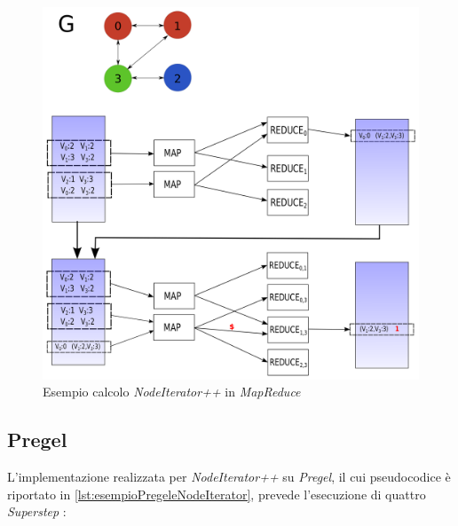 \documentclass[LaM,binding=0.6cm]{sapthesis}
\begin{document}
\begin{minipage}{\linewidth}
	
\end{minipage}
\begin{minipage}{\linewidth}
	
\end{minipage}


\begin{figure}
\centering
\includegraphics[width=1\textwidth]{MR-trianglepp}
\caption{Esempio calcolo \textit{NodeIterator++} in \textit{MapReduce}}
\label{fig:MRNIT}
\end{figure}

\subsection{Pregel}

L'implementazione realizzata per \textit{NodeIterator++} su \textit{Pregel}, il cui pseudocodice è riportato in \ref{lst:esempioPregeleNodeIterator}, prevede l'esecuzione di quattro \textit{Superstep} :
\end{document}
